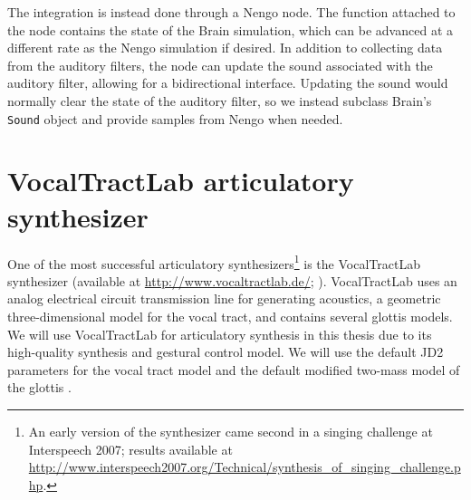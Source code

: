 The integration is instead done
through a Nengo node.
The function attached to the node
contains the state of the Brain simulation,
which can be advanced at a different rate
as the Nengo simulation if desired.
In addition to collecting
data from the auditory filters,
the node can update the
sound associated with
the auditory filter,
allowing for a bidirectional interface.
Updating the sound would normally
clear the state of the auditory filter,
so we instead subclass Brain's
\texttt{Sound} object
and provide samples from
Nengo when needed.

\section{VocalTractLab articulatory synthesizer}
\label{sec:vtl}

One of the most successful articulatory
synthesizers\footnote{An early version of the synthesizer
  came second in a singing challenge
  at Interspeech 2007; results available at
  \url{http://www.interspeech2007.org/Technical/synthesis_of_singing_challenge.php}.}
is the VocalTractLab synthesizer
(available at \url{http://www.vocaltractlab.de/};
\citealp{birkholz2013}).
VocalTractLab uses
an analog electrical circuit transmission line
for generating acoustics,
a geometric three-dimensional model for the vocal tract,
and contains several glottis models.
We will use VocalTractLab
for articulatory synthesis
in this thesis
due to its high-quality synthesis
and gestural control model.
We will use the default JD2 parameters
for the vocal tract model
and the default modified two-mass model
of the glottis \citep{birkholz2011}.
